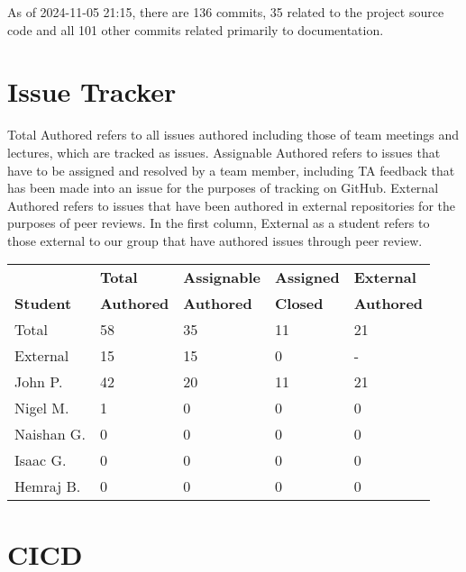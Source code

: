 \documentclass{article}
\begin{document}

As of 2024-11-05 21:15, there are 136 commits, 35 related to the project source code and all 101 other commits related primarily to documentation.

\section{Issue Tracker}


Total Authored refers to all issues authored including those of team meetings and lectures, which are tracked as issues. Assignable Authored refers to issues that have to be assigned and resolved by a team member, including TA feedback that has been made into an issue for the purposes of tracking on GitHub. External Authored refers to issues that have been authored in external repositories for the purposes of peer reviews. In the first column, External as a student refers to those external to our group that have authored issues through peer review.

\begin{table}[H]
\centering
\begin{tabular}{lllll}
\toprule
\textbf{ } & \textbf{Total} & \textbf{Assignable} & \textbf{Assigned} & \textbf{External}\\
\textbf{Student} & \textbf{Authored} & \textbf{Authored} & \textbf{Closed} & \textbf{Authored}\\
\midrule
Total & 58 & 35 & 11 & 21 \\
\midrule
External & 15 & 15 & 0 & - \\
John P. & 42 & 20 & 11 & 21 \\
Nigel M. & 1 & 0 & 0 & 0 \\
Naishan G. & 0 & 0 & 0 & 0 \\
Isaac G. & 0 & 0 & 0 & 0 \\
Hemraj B. & 0 & 0 & 0 & 0 \\
\bottomrule
\end{tabular}
\end{table}





\section{CICD}


\end{document}

